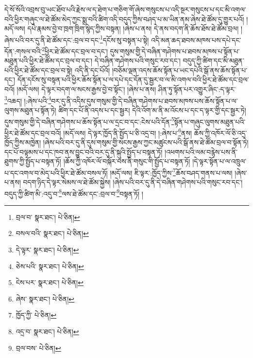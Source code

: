 དེ་སོ་སོའི་འབྲས་བུ་ཡང་ཐོབ་པའི་རྗེས་ལ་ད་ཐེག་པ་གཅིག་གོ་ཞེས་གསུངས་པ་འདི་སྔར་གསུངས་པ་དང་མི་འགལ་བའི་ཕྱིར་གཞུང་ལ་ཐེ་ཚོམ་མེད་ཀྱང་སྨྲ་བའི་ཚིག་འདི་བདུད་ཀྱིས་བཤད་པ་མ་ཡིན་ནམ་ཞེས་ཐེ་ཚོམ་དུ་གྱུར་པའོ། །མདོ་ལས། དཔེ་རྣམས་བྱེ་བ་ཁྲག་ཁྲིག་སྙེད་ཀྱིས་བསྟན། །ཞེས་པ་ནས། དེ་ནས་བདག་ནི་ཆོས་ཐོས་ཐེ་ཚོམ་བྲལ། །ཞེས་པའི་བར་དུ་ནི་ཐེ་ཚོམ་དང་:བྲལ་བ་དང་\footnote{བྲལ་བ་  སྣར་ཐང་།  པེ་ཅིན། }དངོས་སུ་བསྟན་པ་སྟེ། འདི་མན་ཆད་ཐབས་མཁས་པས་དཔེ་དང་དོན་:གསལ་བའི་\footnote{བསལ་བའི་  སྣར་ཐང་།  པེ་ཅིན། }ཕྱིར་ཐེ་ཚོམ་དང་བྲལ་བ་དང་། དུས་གསུམ་གྱི་དེ་བཞིན་གཤེགས་པ་ཐབས་མཁས་པ་སྟོན་པ་མཐུན་པའི་ཕྱིར་ཐེ་ཚོམ་དང་བྲལ་བ་དང་། དེ་བཞིན་གཤེགས་པའི་གསུང་རབ་དང་། བདུད་ཀྱི་ཚིག་དང་མི་མཐུན་པའི་ཕྱིར་ཐེ་ཚོམ་དང་བྲལ་བ་སྟེ། འདི་ནི་དང་པོའོ། །བཅོམ་ལྡན་འདས་ཆོས་སྟོན་པ་ཡང་དཔེའི་སྒོ་ནས་ཆོས་སྟོན་པ་དང་། དོན་དངོས་སུ་བསྟན་པའི་ཕྱིར་ཆོས་སྟོན་པ་ལ་དཔེ་དང་དོན་དུ་སྦྱར་བ་ལ་མི་འགལ་བའི་ཕྱིར་ཐེ་ཚོམ་དང་བྲལ་བའོ། །མདོ་ལས། དེ་ལྟར་བདག་ལ་སངས་རྒྱས་བྱེ་བ་སྟོང་། །ཞེས་པ་ནས། ཤིན་ཏུ་སྟོན་པར་འགྱུར་ཞིང་:ད་ལྟར་\footnote{དེ་ལྟར་  སྣར་ཐང་།  པེ་ཅིན། }འཆད། །:ཞེས་པའི་\footnote{ཅེས་པའི་  སྣར་ཐང་།  པེ་ཅིན། }བར་དུ་ནི་འདིས་དུས་གསུམ་གྱི་དེ་བཞིན་གཤེགས་པ་ཐབས་མཁས་པས་ཆོས་སྟོན་པ་ལ་ལུགས་མཐུན་པ་སྟོན་ཏེ། ཚིག་དང་པོ་ནི་འདས་པ་དང་སྦྱར། དེའི་འོག་མ་ནི་མ་འོངས་པ་དང་ད་ལྟར་གྱི་དང་སྦྱར་ཏེ། དུས་གསུམ་གྱི་དེ་བཞིན་གཤེགས་པ་ཆོས་སྟོན་པ་ལ་དྲང་བ་དང་:ངེས་པའི་དོན་\footnote{ངེས་པར་  སྣར་ཐང་།  པེ་ཅིན། }སྟོན་པ་གཞུང་ལུགས་མཐུན་པའི་ཕྱིར་ཐེ་ཚོམ་དང་བྲལ་བའོ། །མདོ་ལས། དེ་ལྟར་ཁྱོད་ནི་སྤྱོད་པ་ཅི་འདྲ་བ། །:ཞེས་པ་\footnote{ཞེས་  སྣར་ཐང་།  པེ་ཅིན། }ནས། ཆོས་ཀྱི་འཁོར་ལོ་ཅི་འདྲ་ཁྱོད་ཀྱིས་མཁྱེན། །ཞེས་པའི་བར་དུ་ནི་དུས་གསུམ་གྱི་སངས་རྒྱས་ཀྱང་མཚུངས་པའི་སྒོ་ནས་ཐེ་ཚོམ་བྲལ་བ་སྟོན་ཏེ། དང་པོ་བལྟམས་པ་དང་ཁབ་ནས་བྱུང་བའི་བར་དུ་ནི་སྐུའི་སྤྱོད་པ་བསྟན་ཏོ། །འཕགས་པའི་ལམ་བརྙེས་པས་ནི་ཐུགས་ཀྱི་སྤྱོད་པ་བསྟན་ཏོ། །ཆོས་ཀྱི་འཁོར་ལོ་བསྐོར་བས་ནི་གསུང་གི་སྤྱོད་པ་བསྟན་ཏོ། །དེ་ལྟར་སྟོན་པ་ལ་འཁྲུལ་པ་དང་འགལ་བ་མེད་པའི་ཕྱིར་ཐེ་ཚོམ་བསལ་ཏོ། །མདོ་ལས། ཇི་ལྟར་:ཁྱོད་ཀྱིས་\footnote{ཁྱོད་ཀྱི་  པེ་ཅིན། }ཆོས་བཤད་གནས་པ་ལས། །ཞེས་པ་ནས། བདག་ཉིད་དེ་ལྟར་སེམས་ལ་ཐེ་ཚོམ་སྐྱེས། །ཞེས་པའི་བར་དུ་ནི་དེ་བཞིན་གཤེགས་པའི་གསུང་རབ་དང་། བདུད་ཀྱི་ཚིག་མི་:འདུ་བ་\footnote{འདྲ་བ་  སྣར་ཐང་།  པེ་ཅིན། }ལས་ཐེ་ཚོམ་དང་:བྲལ་བ་\footnote{བྲལ་བས་  པེ་ཅིན། }བསྟན་ཏོ། །
